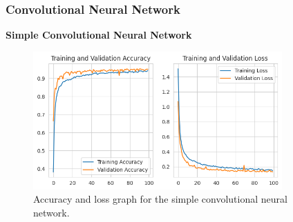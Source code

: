\subsubsection{Convolutional Neural Network}

\textbf{Simple Convolutional Neural Network}

\begin{figure}[ht]
    \centering
    \includegraphics[width=0.85\textwidth]{./img/cnn/simple/accuracy-loss-graph}
    \caption{Accuracy and loss graph for the simple convolutional neural network.}
    \label{fig:cnn-simple-accuracy-loss-graph}
\end{figure}

